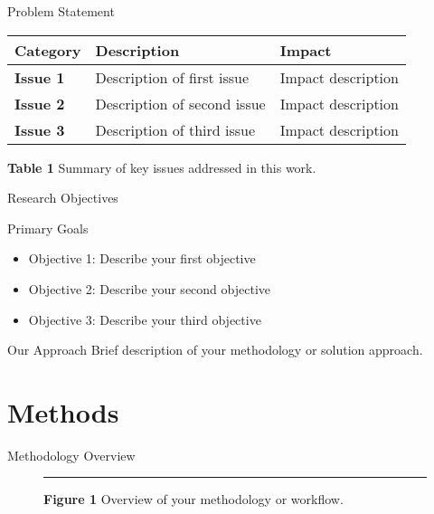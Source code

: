 \documentclass[aspectratio=169]{beamer}
\begin{document}
\begin{frame}{Problem Statement}
  \begin{table}
    \begin{tabular}{|p{3cm}|p{5cm}|p{5cm}|}
      \hline
      \rowcolor{conesaLightGray}
      \textbf{Category} & \textbf{Description} & \textbf{Impact} \\
      \hline
      \textbf{Issue 1} & Description of first issue & Impact description \\
      \hline
      \textbf{Issue 2} & Description of second issue & Impact description \\
      \hline
      \textbf{Issue 3} & Description of third issue & Impact description \\
      \hline
    \end{tabular}
    
    \vspace{0.2cm}
    {\small \textbf{Table 1} \textbar{} Summary of key issues addressed in this work.}
  \end{table}
\end{frame}

\begin{frame}{Research Objectives}
  \begin{alertblock}{Primary Goals}
    \begin{itemize}
      \item Objective 1: Describe your first objective
      \item Objective 2: Describe your second objective
      \item Objective 3: Describe your third objective
    \end{itemize}
  \end{alertblock}
  
  \begin{block}{Our Approach}
    Brief description of your methodology or solution approach.
  \end{block}
\end{frame}

\section{Methods}

\begin{frame}{Methodology Overview}
  \begin{figure}
    \centering
    \rule{0.8\textwidth}{0.5\textheight} %
    {\small \textbf{Figure 1} \textbar{} Overview of your methodology or workflow.}
  \end{figure}
\end{frame}
\end{document}
